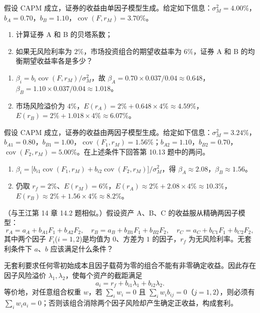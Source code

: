 \begin{problem}
 假设 CAPM 成立，证券的收益由单因子模型生成。给定如下信息：$\sigma_M^2=4.00\%$，$b_A=0.70$，$b_B=1.10$，$\operatorname{cov}(F,r_M)=3.70\%$。
\begin{enumerate}[label=(\alph*)]
    \item 计算证券 A 和 B 的贝塔系数；
    \item 如果无风险利率为 $2\%$，市场投资组合的期望收益率为 $6\%$，证券 A 和 B 的均衡期望收益率各是多少？
\end{enumerate}
\end{problem}
\begin{solution}
\begin{enumerate}[label=(\alph*)]
\item $\beta_i=b_i\operatorname{cov}(F,r_M)/\sigma_M^2$，故 $\beta_A=0.70\times0.037/0.04\approx0.648$，$\beta_B=1.10\times0.037/0.04\approx1.018$。
\item 市场风险溢价为 $4\%$，$E(r_A)=2\%+0.648\times4\%\approx4.59\%$，$E(r_B)=2\%+1.018\times4\%\approx6.07\%$。
\end{enumerate}
\end{solution}
\begin{problem}
 假设 CAPM 成立，证券的收益由两因子模型生成。给定如下信息：$\sigma_M^2=3.24\%$，$b_{A1}=0.80$，$b_{B1}=1.00$，$\operatorname{cov}(F_1,r_M)=1.56\%$；$b_{A2}=1.10$，$b_{B2}=0.70$，$\operatorname{cov}(F_2,r_M)=5.00\%$。在上述条件下回答第 10.13 题中的两问。
\end{problem}
\begin{solution}
\begin{enumerate}[label=(\alph*)]
\item $\beta_i=\bigl[b_{i1}\operatorname{cov}(F_1,r_M)+b_{i2}\operatorname{cov}(F_2,r_M)\bigr]/\sigma_M^2$，得 $\beta_A\approx2.08$，$\beta_B\approx1.56$。
\item 仍取 $r_f=2\%$、$E(r_M)=6\%$，$E(r_A)\approx2\%+2.08\times4\%\approx10.3\%$，$E(r_B)\approx2\%+1.56\times4\%\approx8.2\%$。
\end{enumerate}
\end{solution}
\begin{problem}
（与王江第 14 章 14.2 题相似。）假设资产 A、B、C 的收益服从精确两因子模型：
\[
    r_A=a_A+b_{A1}F_1+b_{A2}F_2,\quad
    r_B=a_B+b_{B1}F_1+b_{B2}F_2,\quad
    r_C=a_C+b_{C1}F_1+b_{C2}F_2,
\]
其中两个因子 $F_i$($i=1,2$)是均值为 $0$、方差为 $1$ 的因子，$r_f$ 为无风险利率。无套利条件下 $a$、$b$ 应该满足什么条件？
\end{problem}
\begin{solution}
无套利要求任何零初始成本且因子载荷为零的组合不能有非零确定收益。因此存在因子风险溢价 $\lambda_1,\lambda_2$，使每个资产的截距满足
\[
a_i=r_f+b_{i1}\lambda_1+b_{i2}\lambda_2.
\]
等价地，对任意组合权重 $w$，若 $\sum_iw_i=0$ 且 $\sum_iw_ib_{ij}=0$（$j=1,2$），则必须有 $\sum_iw_ia_i=0$；否则该组合消除两个因子风险却产生确定正收益，构成套利。
\end{solution}
